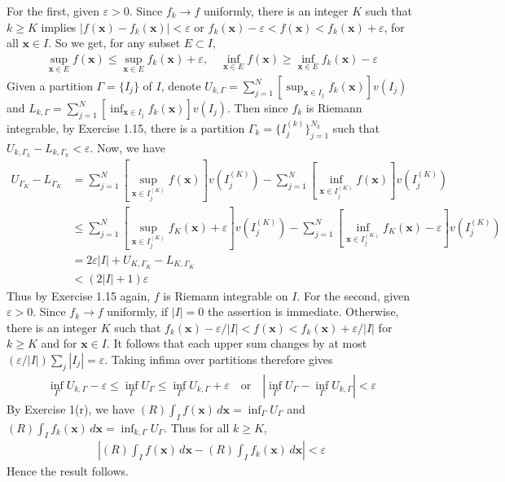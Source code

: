 \documentclass[12pt]{article}
\theoremstyle{definition}
\begin{document}
For the first, given $\varepsilon>0$. Since $f_k\to f$ uniformly, there is an integer $K$ such that $k\ge K$ implies $\left\vert f(\mathbf{x})-f_k(\mathbf{x})\right\vert<\varepsilon$ or $f_k(\mathbf{x})-\varepsilon<f(\mathbf{x})<f_k(\mathbf{x})+\varepsilon$, for all $\mathbf{x}\in I$. So we get, for any subset $E\subset I$, 
\begin{align*}
\sup_{\mathbf{x}\in E}f(\mathbf{x})\le \sup_{\mathbf{x}\in E}f_k(\mathbf{x})+\varepsilon,\quad
\inf_{\mathbf{x}\in E}f(\mathbf{x})\ge \inf_{\mathbf{x}\in E}f_k(\mathbf{x})-\varepsilon
\end{align*}
Given a partition $\Gamma=\{I_j\}$ of $I$, denote $U_{k,\Gamma}=\sum_{j=1}^N\left[\sup_{\mathbf{x}\in I_j}f_k(\mathbf{x})\right]v(I_j)$ and $L_{k,\Gamma}=\sum_{j=1}^N\left[\inf_{\mathbf{x}\in I_j}f_k(\mathbf{x})\right]v(I_j)$. Then since $f_k$ is Riemann integrable, by Exercise 1.15, there is a partition $\Gamma_k=\{I_j^{(k)}\}_{j=1}^{N_k}$ such that $U_{k,\Gamma_k}-L_{k,\Gamma_k}<\varepsilon$. Now, we have
\begin{align*}
U_{\Gamma_K}-L_{\Gamma_K}
&=\sum_{j=1}^N\left[\sup_{\mathbf{x}\in I_j^{(K)}}f(\mathbf{x})\right]v(I_j^{(K)})
-\sum_{j=1}^N\left[\inf_{\mathbf{x}\in I_j^{(K)}}f(\mathbf{x})\right]v(I_j^{(K)}) \\
&\le\sum_{j=1}^N\left[\sup_{\mathbf{x}\in I_j^{(K)}}f_K(\mathbf{x})+\varepsilon\right]v(I_j^{(K)})
-\sum_{j=1}^N\left[\inf_{\mathbf{x}\in I_j^{(K)}}f_K(\mathbf{x})-\varepsilon\right]v(I_j^{(K)}) \\
&=2\varepsilon\left\vert I\right\vert
+U_{K,\Gamma_K}-L_{K,\Gamma_K}\\
&<\left(2\left\vert I\right\vert+1\right)\varepsilon
\end{align*}
Thus by Exercise 1.15 again, $f$ is Riemann integrable on $I$.
For the second, given $\varepsilon>0$. Since $f_k\to f$ uniformly, if $|I|=0$ the assertion is immediate. Otherwise, there is an integer $K$ such that $f_k(\mathbf{x})-\varepsilon/|I|<f(\mathbf{x})<f_k(\mathbf{x})+\varepsilon/|I|$ for $k\ge K$ and for $\mathbf{x}\in I$. It follows that each upper sum changes by at most
$(\varepsilon/|I|)\sum_j |I_j|=\varepsilon$.  Taking infima over partitions therefore gives
\begin{align*}
\inf_{\Gamma}U_{k,\Gamma}-\varepsilon
\le\inf_{\Gamma}U_\Gamma
\le \inf_{\Gamma}U_{k,\Gamma}+\varepsilon\quad\mbox{or}\quad
\left\vert\inf_{\Gamma}U_\Gamma-\inf_{\Gamma}U_{k,\Gamma}\right\vert<\varepsilon
\end{align*}
By Exercise 1(r), we have $(R)\int_If(\mathbf{x})\,d\mathbf{x}=\inf_{\Gamma}U_\Gamma$ and $(R)\int_If_k(\mathbf{x})\,d\mathbf{x}=\inf_{k,\Gamma}U_\Gamma$. Thus for all $k\ge K$,
\begin{align*}
\left\vert(R)\int_If(\mathbf{x})\,d\mathbf{x}-(R)\int_If_k(\mathbf{x})\,d\mathbf{x}\right\vert<\varepsilon
\end{align*}
Hence the result follows.
\end{document}
